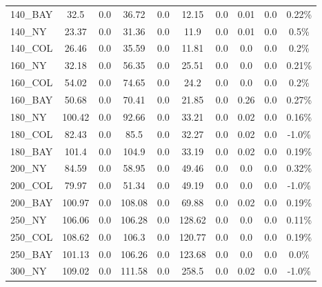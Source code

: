 \documentclass[main.tex]{subfiles}
\begin{document}
\begin{center}
\begin{tabular}{lccccccccc}
140\_BAY & 32.5 & 0.0 & 36.72 & 0.0 & 12.15 & 0.0 & 0.01 & 0.0 & 0.22\%\\
140\_NY & 23.37 & 0.0 & 31.36 & 0.0 & 11.9 & 0.0 & 0.01 & 0.0 & 0.5\%\\
140\_COL & 26.46 & 0.0 & 35.59 & 0.0 & 11.81 & 0.0 & 0.0 & 0.0 & 0.2\%\\
160\_NY & 32.18 & 0.0 & 56.35 & 0.0 & 25.51 & 0.0 & 0.0 & 0.0 & 0.21\%\\
160\_COL & 54.02 & 0.0 & 74.65 & 0.0 & 24.2 & 0.0 & 0.0 & 0.0 & 0.2\%\\
160\_BAY & 50.68 & 0.0 & 70.41 & 0.0 & 21.85 & 0.0 & 0.26 & 0.0 & 0.27\%\\
180\_NY & 100.42 & 0.0 & 92.66 & 0.0 & 33.21 & 0.0 & 0.02 & 0.0 & 0.16\%\\
180\_COL & 82.43 & 0.0 & 85.5 & 0.0 & 32.27 & 0.0 & 0.02 & 0.0 & -1.0\%\\
180\_BAY & 101.4 & 0.0 & 104.9 & 0.0 & 33.19 & 0.0 & 0.02 & 0.0 & 0.19\%\\
200\_NY & 84.59 & 0.0 & 58.95 & 0.0 & 49.46 & 0.0 & 0.0 & 0.0 & 0.32\%\\
200\_COL & 79.97 & 0.0 & 51.34 & 0.0 & 49.19 & 0.0 & 0.0 & 0.0 & -1.0\%\\
200\_BAY & 100.97 & 0.0 & 108.08 & 0.0 & 69.88 & 0.0 & 0.02 & 0.0 & 0.19\%\\
250\_NY & 106.06 & 0.0 & 106.28 & 0.0 & 128.62 & 0.0 & 0.0 & 0.0 & 0.11\%\\
250\_COL & 108.62 & 0.0 & 106.3 & 0.0 & 120.77 & 0.0 & 0.0 & 0.0 & 0.19\%\\
250\_BAY & 101.13 & 0.0 & 106.26 & 0.0 & 123.68 & 0.0 & 0.0 & 0.0 & 0.0\%\\
300\_NY & 109.02 & 0.0 & 111.58 & 0.0 & 258.5 & 0.0 & 0.02 & 0.0 & -1.0\%\\
\hline\end{tabular}
\end{center}
\newpage
\end{document}
